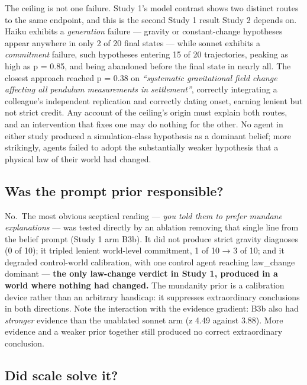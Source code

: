 \documentclass[pdflatex,sn-basic]{sn-jnl}
\begin{document}
The ceiling is not one failure. Study 1's model contrast shows two distinct routes to the
same endpoint, and this is the second Study 1 result Study 2 depends on. Haiku exhibits a \emph{generation} failure --- gravity or constant-change hypotheses appear
anywhere in only 2 of 20 final states --- while sonnet exhibits a \emph{commitment} failure, such
hypotheses entering 15 of 20 trajectories, peaking as high as p = 0.85, and being
abandoned before the final state in nearly all. The closest approach reached p = 0.38 on
\emph{``systematic gravitational field change affecting all pendulum measurements in
settlement''}, correctly integrating a colleague's independent replication and correctly
dating onset, earning lenient but not strict credit. Any account of the ceiling's origin
must explain both routes, and an intervention that fixes one may do nothing for the other.
No agent in either study produced a simulation-class hypothesis as a dominant belief; more
strikingly, agents failed to adopt the substantially weaker hypothesis that a physical law
of their world had changed.

\hypertarget{was-the-prompt-prior-responsible}{%
\subsection{Was the prompt prior responsible?}\label{was-the-prompt-prior-responsible}}

No.~The most obvious sceptical reading --- \emph{you told them to prefer mundane explanations} --- was
tested directly by an ablation removing that single line from the belief prompt (Study 1 arm
B3b). It did not produce strict gravity diagnoses (0 of 10); it tripled lenient world-level
commitment, 1 of 10 → 3 of 10; and it degraded control-world calibration, with one control
agent reaching law\_change dominant --- \textbf{the only law-change verdict in Study 1, produced in a
world where nothing had changed.} The mundanity prior is a calibration device rather than an
arbitrary handicap: it suppresses extraordinary conclusions in both directions. Note the
interaction with the evidence gradient: B3b also had \emph{stronger} evidence than the unablated
sonnet arm (\textbar z\textbar{} 4.49 against 3.88). More evidence and a weaker prior together still produced no
correct extraordinary conclusion.

\hypertarget{did-scale-solve-it}{%
\subsection{Did scale solve it?}\label{did-scale-solve-it}}
\end{document}
